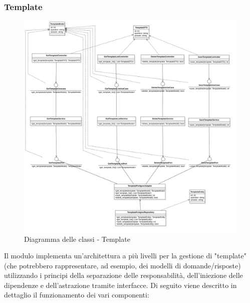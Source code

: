     \subsubsection{Template}
    \begin{figure}[H]
        \centering
        \includegraphics[width=\linewidth, height=0.8\textheight, keepaspectratio]{./img/png/Model7!Template_7.png}
        \caption{Diagramma delle classi - Template}
        \label{fig:template}
    \end{figure}

    Il modulo implementa un'architettura a più livelli per la gestione di "template" (che potrebbero rappresentare, ad esempio, dei modelli di domande/risposte) utilizzando i principi della separazione delle responsabilità, dell'iniezione delle dipendenze e dell'astrazione tramite interfacce. Di seguito viene descritto in dettaglio il funzionamento dei vari componenti:
    
